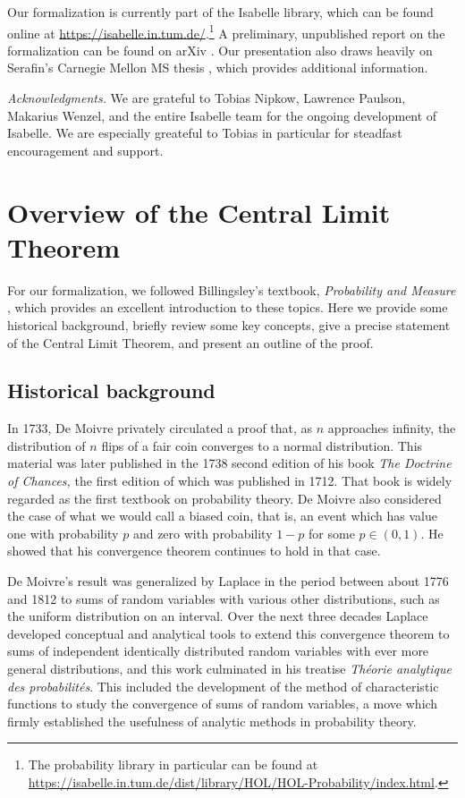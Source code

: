 \documentclass{svjour3}
\begin{document}
Our formalization is currently part of the Isabelle library, which can be found online at \url{https://isabelle.in.tum.de/}.\footnote{The probability library in particular can be found at \url{https://isabelle.in.tum.de/dist/library/HOL/HOL-Probability/index.html}.} A preliminary, unpublished report on the formalization can be found on arXiv \cite{avigad:hoelzl:serafin:14}. Our presentation also draws heavily on Serafin's Carnegie Mellon MS thesis \cite{serafin:15}, which provides additional information.

\emph{Acknowledgments.} We are grateful to Tobias Nipkow, Lawrence Paulson, Makarius Wenzel, and the entire Isabelle team for the ongoing development of Isabelle. We are especially greateful to Tobias in particular for steadfast encouragement and support.

\section{Overview of the Central Limit Theorem}
\label{section:overview}

For our formalization, we followed Billingsley's textbook, \emph{Probability and Measure} \cite{billingsley:95}, which provides an excellent introduction to these topics. Here we provide some historical background, briefly review some key concepts, give a precise statement of the Central Limit Theorem, and present an outline of the proof.

\subsection{Historical background}
\label{subsection:historical}

In 1733, De Moivre privately circulated a proof that, as $n$ approaches infinity, the distribution of $n$ flips of a fair coin converges to a normal distribution. This material was later published in the 1738 second edition of his book {\em The Doctrine of Chances,} the first edition of which was published in 1712. That book is widely regarded as the first textbook on probability theory. De Moivre also considered the case of what we would call a biased coin, that is, an event which has value one with probability $p$ and zero with probability $1-p$ for some $p \in (0,1)$. He showed that his convergence theorem continues to hold in that case.

De Moivre's result was generalized by Laplace in the period between about 1776 and 1812 to sums of random variables with various other distributions, such as the uniform distribution on an interval. Over the next three decades Laplace developed conceptual and analytical tools to extend this convergence theorem to sums of independent identically distributed random variables with ever more general distributions, and this work culminated in his treatise {\em Th\'eorie analytique des probabilit\'es}. This included the development of the method of characteristic functions to study the convergence of sums of random variables, a move which firmly established the usefulness of analytic methods in probability theory.
\end{document}
